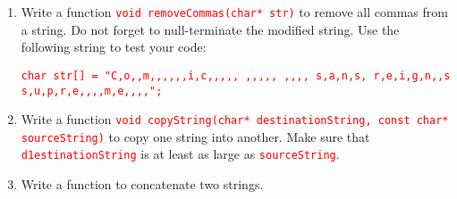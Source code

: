 \documentclass[12pt]{article}
\begin{document}
\begin{enumerate}
    \item Write a function \textcolor{red}{\texttt{void removeCommas(char* str)}} to remove all commas from a string. Do not forget to null-terminate the modified string. Use the following 
    string to test your code:

    \textcolor{red}{\texttt{char str[] = "C,o,,m,,,,,,i,c,,,,,  ,,,,, ,,,, s,a,n,s, r,e,i,g,n,,s s,u,p,r,e,,,,m,e,,,,";}}

    \item Write a function \textcolor{red}{\texttt{void copyString(char* destinationString, const char* sourceString)}} to copy one string into another. Make sure that 
    \textcolor{red}{\texttt{d1estinationString}} is at least as large as \textcolor{red}{\texttt{sourceString}}.

    \item Write a function to concatenate two strings.

\end{enumerate}
\end{document}
